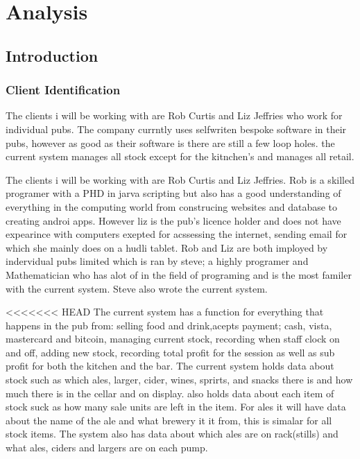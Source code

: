 \chapter{Analysis}

\section{Introduction}

\subsection{Client Identification}
The clients i will be working with are Rob Curtis and Liz Jeffries who work for individual pubs. The company currntly uses selfwriten bespoke software in their pubs, however as good as their software is there are still a few loop holes. the current system manages all stock except for the kitnchen's and manages all retail. 

The clients i will be working with are Rob Curtis and Liz Jeffries. Rob is a skilled programer with a PHD in jarva scripting but also has a good understanding of everything in the computing world from construcing websites and database to creating androi apps. However liz is the pub's licence holder and does not have expearince with computers exepted for acssessing the internet, sending email for which she mainly does on a hudli tablet. Rob and Liz are both imployed by indervidual pubs limited which is ran by steve; a highly programer and Mathematician who has alot of in the field of programing and is the most familer with the current system. Steve also wrote the current system.

<<<<<<< HEAD
The current system has a function for everything that happens in the pub from: selling food and drink,acepts payment; cash, vista, mastercard and bitcoin, managing current stock, recording when staff clock on and off, adding new stock, recording total profit for the session as well as sub profit for both the kitchen and the bar. The current system holds data about stock such as which ales, larger, cider, wines, sprirts, and snacks there is and how much there is in the cellar and on display. also holds data about each item of stock suck as how many sale units are left in the item. For ales it will have data about the name of the ale and what brewery it it from, this is simalar for all stock items. The system also has data about which ales are on rack(stills) and what ales, ciders and largers are on each pump.

